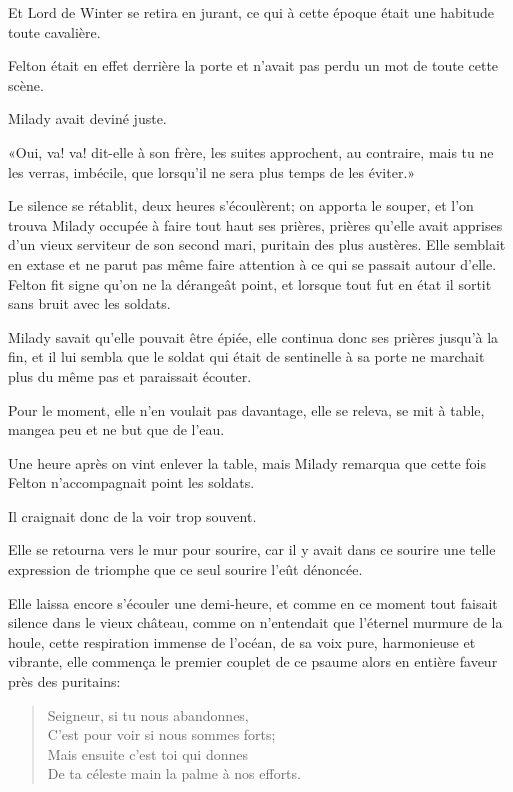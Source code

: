 Et Lord de Winter se retira en jurant, ce qui à cette époque était une habitude toute cavalière. 

Felton était en effet derrière la porte et n'avait pas perdu un mot de toute cette scène. 

Milady avait deviné juste. 

«Oui, va! va! dit-elle à son frère, les suites approchent, au contraire, mais tu ne les verras, imbécile, que lorsqu'il ne sera plus temps de les éviter.» 

Le silence se rétablit, deux heures s'écoulèrent; on apporta le souper, et l'on trouva Milady occupée à faire tout haut ses prières, prières qu'elle avait apprises d'un vieux serviteur de son second mari, puritain des plus austères. Elle semblait en extase et ne parut pas même faire attention à ce qui se passait autour d'elle. Felton fit signe qu'on ne la dérangeât point, et lorsque tout fut en état il sortit sans bruit avec les soldats. 

Milady savait qu'elle pouvait être épiée, elle continua donc ses prières jusqu'à la fin, et il lui sembla que le soldat qui était de sentinelle à sa porte ne marchait plus du même pas et paraissait écouter. 

Pour le moment, elle n'en voulait pas davantage, elle se releva, se mit à table, mangea peu et ne but que de l'eau. 

Une heure après on vint enlever la table, mais Milady remarqua que cette fois Felton n'accompagnait point les soldats. 

Il craignait donc de la voir trop souvent. 

Elle se retourna vers le mur pour sourire, car il y avait dans ce sourire une telle expression de triomphe que ce seul sourire l'eût dénoncée. 

Elle laissa encore s'écouler une demi-heure, et comme en ce moment tout faisait silence dans le vieux château, comme on n'entendait que l'éternel murmure de la houle, cette respiration immense de l'océan, de sa voix pure, harmonieuse et vibrante, elle commença le premier couplet de ce psaume alors en entière faveur près des puritains: 

\begin{verse}
Seigneur, si tu nous abandonnes,\\
C'est pour voir si nous sommes forts;\\
Mais ensuite c'est toi qui donnes\\
De ta céleste main la palme à nos efforts. 
\end{verse}

